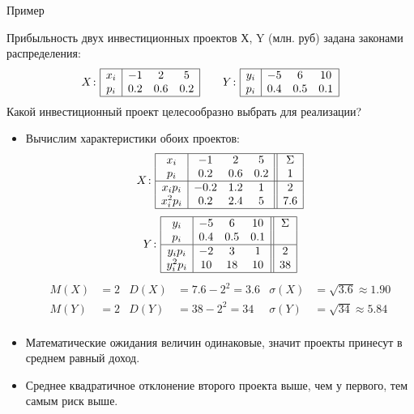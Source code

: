 \documentclass[unicode,11pt,notheorems,xcolor=table]{beamer}
\begin{document}
\begin{frame}[allowframebreaks]{Пример}{}
    \begin{exampleblock}{}
        Прибыльность двух инвестиционных проектов Х, Y (млн. руб) задана законами распределения:
        $$
            X\colon\begin{array}{|c|ccc|}
                \hline
                x_i & -1 & 2 & 5 \\
                p_i & 0.2 & 0.6 & 0.2\\
                \hline
            \end{array}
            \qquad
            Y\colon\begin{array}{|c|ccc|}
                \hline
                y_i & -5 & 6 & 10 \\
                p_i & 0.4 & 0.5 & 0.1\\
                \hline
            \end{array}           
        $$
        Какой инвестиционный проект целесообразно выбрать для реализации?
    \end{exampleblock}
    \begin{itemize}
        \item Вычислим характеристики обоих проектов:
        $$
            X\colon\begin{array}{|c|ccc||c|}
                \hline
                x_i & -1 & 2 & 5  & \Sigma\\
                p_i & 0.2 & 0.6 & 0.2 & 1\\
                \hline
                x_ip_i & -0.2 & 1.2 & 1 & 2\\
                x^2_ip_i & 0.2 & 2.4 & 5 & 7.6\\
                \hline
            \end{array}
        $$
        $$
            Y\colon\begin{array}{|c|ccc||c|}
                \hline
                y_i & -5 & 6 & 10 & \Sigma\\
                p_i & 0.4 & 0.5 & 0.1 & \\
                \hline                
                y_ip_i & -2 & 3 & 1 & 2\\
                y^2_ip_i & 10 & 18 & 10 & 38\\
                \hline
            \end{array}           
        $$    
        \begin{align*}
            M(X) &= 2 & D(X) &= 7.6-2^2=3.6 & \sigma(X) &=  \sqrt{3.6} \approx 1.90\\
            M(Y) &= 2 & D(Y) &= 38-2^2=34 & \sigma(Y) &=  \sqrt{34} \approx 5.84\\
        \end{align*}
        \item Математические ожидания величин одинаковые, значит проекты принесут в среднем равный доход.
        \item Среднее квадратичное отклонение второго проекта выше, чем у первого, тем самым риск выше.
    \end{itemize}
    
\end{frame}
\end{document}
